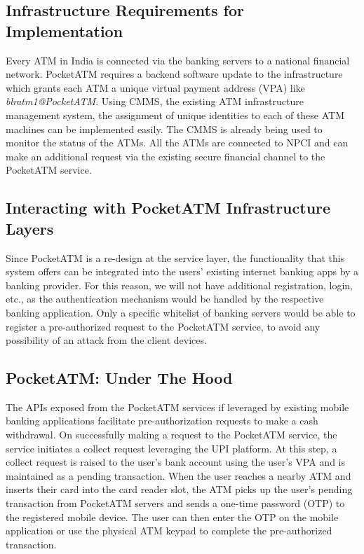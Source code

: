 \subsection*{Infrastructure Requirements for Implementation}
\label{ssec:infrastructurerequirements}

Every ATM in India is connected via the banking servers to a national financial network. PocketATM requires a backend software update to the infrastructure which grants each ATM a unique virtual payment address (VPA) like \textit{blratm1@PocketATM}. Using CMMS, the existing ATM infrastructure management system, the assignment of unique identities to each of these ATM machines can be implemented easily. The CMMS is already being used to monitor the status of the ATMs. All the ATMs are connected to NPCI and can make an additional request via the existing secure financial channel to the PocketATM service. 

\subsection*{Interacting with PocketATM Infrastructure Layers}
\label{ssec:interactionpocketATMInfra}

Since PocketATM is a re-design at the service layer, the functionality that this system offers can be integrated into the users' existing internet banking apps by a banking provider. For this reason, we will not have additional registration, login, etc., as the authentication mechanism would be handled by the respective banking application. Only a specific whitelist of banking servers would be able to register a pre-authorized request to the PocketATM service, to avoid any possibility of an attack from the client devices.

\subsection*{PocketATM: Under The Hood}
\label{ssec:underthehood}

The APIs exposed from the PocketATM services if leveraged by existing mobile banking applications facilitate pre-authorization requests to make a cash withdrawal. On successfully making a request to the PocketATM service, the service initiates a collect request leveraging the UPI platform. At this step, a collect request is raised to the user's bank account using the user's VPA and is maintained as a pending transaction. When the user reaches a nearby ATM and inserts their card into the card reader slot, the ATM picks up the user's pending transaction from PocketATM servers and sends a one-time password (OTP) to the registered mobile device. The user can then enter the OTP on the mobile application or use the physical ATM keypad to complete the pre-authorized transaction. 

